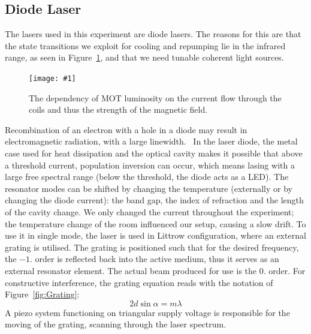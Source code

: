 \documentclass[twocolumn]{article}
\newcommand{\insertFigure}[1]{%
   \texttt{[image: \#1]}%
}
\begin{document}
\subsection{Diode Laser} \label{sec:laser}
The lasers used in this experiment are diode lasers. The reasons for this are that the state transitions we exploit for cooling and repumping lie in the infrared range, as seen in Figure~\ref{fig:Laser}, and that we need tunable coherent light sources.
\begin{figure} [!h]
	\centering
	\insertFigure{Images/Laser.png}
	\caption{The dependency of MOT luminosity on the current flow through the coils and thus the strength of the magnetic field.\cite{manual}}
	\label{fig:Laser}
\end{figure}
Recombination of an electron with a hole in a diode may result in electromagnetic radiation, with a large linewidth.~\cite{demtroder} In the laser diode, the metal case used for heat dissipation and the optical cavity makes it possible that above a threshold current, population inversion can occur, which means lasing with a large free spectral range (below the threshold, the diode acts as a LED). The resonator modes can be shifted by changing the temperature (externally or by changing the diode current): the band gap, the index of refraction and the length of the cavity change. We only changed the current throughout the experiment; the temperature change of the room influenced our setup, causing a slow drift. To use it in single mode, the laser is used in Littrow configuration, where an external grating is utilised. The grating is positioned such that for the desired frequency, the $-1.$ order is reflected back into the active medium, thus it serves as an external resonator element. The actual beam produced for use is the $0.$ order. For constructive interference, the grating equation reads\cite{demtroder} with the notation of Figure~\ref{fig:Grating}: 
\begin{equation}
2 d \sin \alpha = m \lambda\nonumber
\end{equation}
A piezo system functioning on triangular supply voltage is responsible for the moving of the grating, scanning through the laser spectrum.
\end{document}
